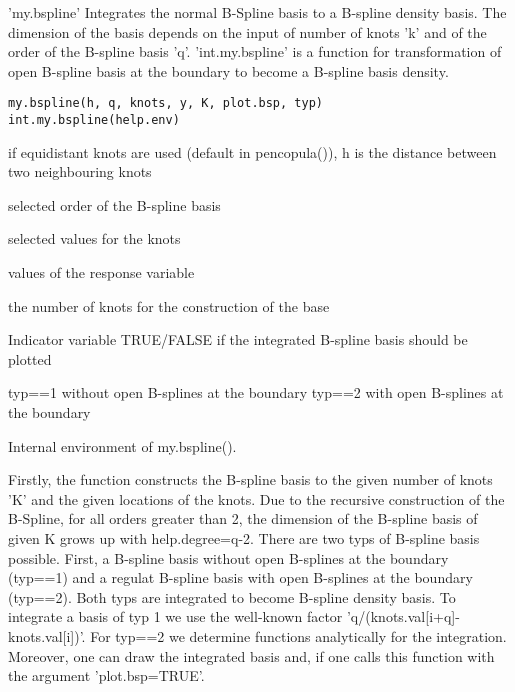 \documentclass[a4paper]{book}
\begin{document}
%
\begin{Description}\relax
'my.bspline' Integrates the normal B-Spline basis to a B-spline density
basis. The dimension of the basis depends on the input of number of
knots 'k' and of the order of the B-spline basis 'q'. 'int.my.bspline'
is a function for transformation of open B-spline basis at the
boundary to become a B-spline basis density.
\end{Description}
%
\begin{Usage}
\begin{verbatim}
my.bspline(h, q, knots, y, K, plot.bsp, typ)
int.my.bspline(help.env)
\end{verbatim}
\end{Usage}
%
\begin{Arguments}
\begin{ldescription}
\item[\code{h}] if equidistant knots are used (default in pencopula()), h is the distance between two neighbouring knots
\item[\code{q}] selected order of the B-spline basis
\item[\code{knots}] selected values for the knots
\item[\code{y}] values of the response variable
\item[\code{K}] the number of knots for the construction of the base
\item[\code{plot.bsp}] Indicator variable TRUE/FALSE if the integrated
B-spline basis should be plotted
\item[\code{typ}] typ==1 without open B-splines at the boundary
typ==2 with open B-splines at the boundary
\item[\code{help.env}] Internal environment of my.bspline().
\end{ldescription}
\end{Arguments}
%
\begin{Details}\relax
Firstly, the function constructs the B-spline basis to the given number
of knots 'K' and the given locations of the knots. Due
to the recursive construction of the B-Spline, for all orders greater
than 2, the dimension of the B-spline basis of given K grows up with
help.degree=q-2.
There are two typs of B-spline basis possible. First, a B-spline basis
without open B-splines at the boundary (typ==1) and a regulat B-spline
basis with open B-splines at the boundary (typ==2).
Both typs are integrated to become B-spline density basis. To
integrate a basis of typ 1 we use the well-known factor
'q/(knots.val[i+q]-knots.val[i])'. For typ==2 we determine
functions analytically for the integration.
Moreover, one can draw the integrated basis and, if one calls this function with the argument 'plot.bsp=TRUE'.
\end{Details}
\end{document}
